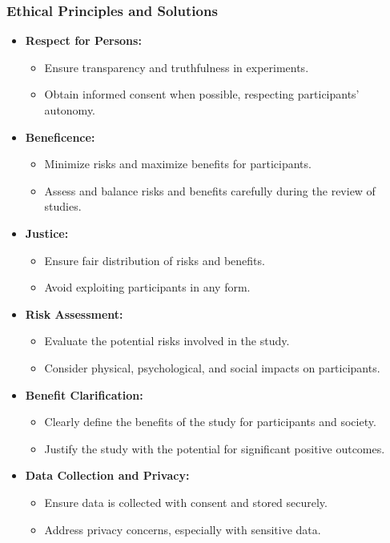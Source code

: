 \documentclass{article}
\begin{document}
\subsubsection*{Ethical Principles and Solutions}
\begin{itemize}
    \item \textbf{Respect for Persons:}
    \begin{itemize}
        \item Ensure transparency and truthfulness in experiments.
        \item Obtain informed consent when possible, respecting participants' autonomy.
    \end{itemize}

    \item \textbf{Beneficence:}
    \begin{itemize}
        \item Minimize risks and maximize benefits for participants.
        \item Assess and balance risks and benefits carefully during the review of studies.
    \end{itemize}

    \item \textbf{Justice:}
    \begin{itemize}
        \item Ensure fair distribution of risks and benefits.
        \item Avoid exploiting participants in any form.
    \end{itemize}

    \item \textbf{Risk Assessment:}
    \begin{itemize}
        \item Evaluate the potential risks involved in the study.
        \item Consider physical, psychological, and social impacts on participants.
    \end{itemize}

    \item \textbf{Benefit Clarification:}
    \begin{itemize}
        \item Clearly define the benefits of the study for participants and society.
        \item Justify the study with the potential for significant positive outcomes.
    \end{itemize}

    \item \textbf{Data Collection and Privacy:}
    \begin{itemize}
        \item Ensure data is collected with consent and stored securely.
        \item Address privacy concerns, especially with sensitive data.
    \end{itemize}


\end{itemize}
\end{document}
